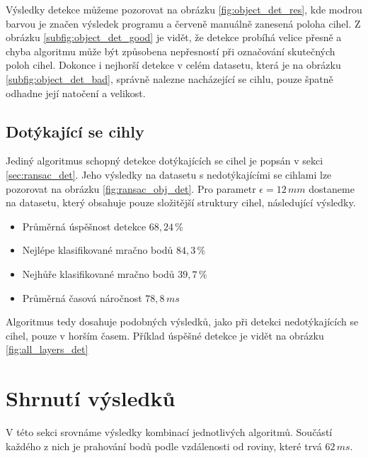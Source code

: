 \documentclass[twoside]{ctuthesis}
\begin{document}
Výsledky detekce můžeme pozorovat na obrázku \ref{fig:object_det_res}, kde modrou barvou je značen výsledek programu a červeně manuálně zanesená poloha cihel. Z obrázku \ref{subfig:object_det_good} je vidět, že detekce probíhá velice přesně a chyba algoritmu může být způsobena nepřesností při označování skutečných poloh cihel. Dokonce i nejhorší detekce v celém datasetu, která je na obrázku \ref{subfig:object_det_bad}, správně nalezne nacházející se cihlu, pouze špatně odhadne její natočení a velikost.

 
\subsection{Dotýkající se cihly}
Jediný algoritmus schopný detekce dotýkajících se cihel je popsán v sekci \ref{sec:ransac_det}. Jeho výsledky na datasetu s nedotýkajícími se cihlami lze pozorovat na obrázku \ref{fig:ransac_obj_det}. Pro parametr $\epsilon = 12\,mm$ dostaneme na datasetu, který obsahuje pouze složitější struktury cihel, následující výsledky.
\begin{itemize}
    \item Průměrná úspěšnost detekce $68,24\,\%$
    \item Nejlépe klasifikované mračno bodů $84,3\,\%$
    \item Nejhůře klasifikované mračno bodů $39,7\,\%$
    \item Průměrná časová náročnost $78,8\,ms$
\end{itemize}
Algoritmus tedy dosahuje podobných výsledků, jako při detekci nedotýkajících se cihel, pouze v horším časem. Příklad úspěšné detekce je vidět na obrázku \ref{fig:all_layers_det}
\section{Shrnutí výsledků}
V této sekci srovnáme výsledky kombinací jednotlivých algoritmů. Součástí každého z nich je prahování bodů podle vzdálenosti od roviny, které trvá $62\,ms$.
\end{document}
